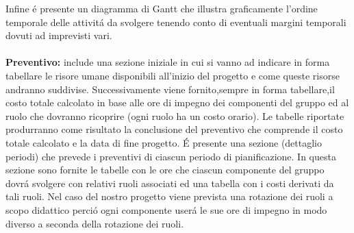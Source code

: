 Infine é presente un diagramma di Gantt che illustra graficamente l'ordine temporale delle attivitá da svolgere tenendo conto di 
eventuali margini temporali dovuti ad imprevisti vari.
\\\\
\textbf{Preventivo:} include una sezione iniziale in cui si vanno ad indicare in forma tabellare le risore umane disponibili all'inizio del progetto e 
come queste risorse andranno suddivise. Successivamente viene fornito,sempre in forma tabellare,il costo totale calcolato in base alle ore 
di impegno dei componenti del gruppo ed al ruolo che dovranno ricoprire (ogni ruolo ha un costo orario).
Le tabelle riportate produrranno come risultato la conclusione del preventivo che comprende il costo totale calcolato e la data di fine progetto.
É presente una sezione (dettaglio periodi) che prevede i preventivi di ciascun periodo di pianificazione.
In questa sezione sono fornite le tabelle con le ore che ciascun componente del gruppo dovrá svolgere con relativi ruoli associati ed una tabella con i costi
derivati da tali ruoli.
Nel caso del nostro progetto viene prevista una rotazione dei ruoli a scopo didattico perció ogni componente userá le sue ore di impegno in modo diverso 
a seconda della rotazione dei ruoli.